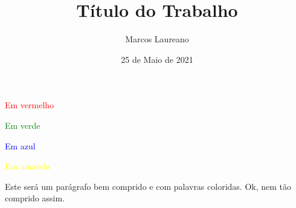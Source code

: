 \documentclass{article}
\title{Título do Trabalho}
\author{Marcos Laureano}
\date{25 de Maio de 2021}
\begin{document}
\maketitle


\textcolor{red}{Em vermelho}

\textcolor{green}{Em verde}

\textcolor{blue}{Em azul}

\textcolor{yellow}{Em amarelo}

Este \textcolor{outracor}{será} um parágrafo bem comprido e com palavras \textcolor{nomecor}{coloridas}. Ok, nem tão comprido assim.




\end{document}
